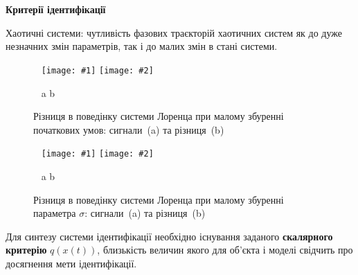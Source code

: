 \documentclass[14pt,handout,utf8]{beamer}
\newcommand{\Xhead}[1]{
 \begin{center}%
      \textbf{#1}%
 \end{center}%
}
\newcommand{\ABlbl}{%
  \vspace{-2.9ex}
  \begin{center}
    ~ \hfill a \hfill\hfill b \hfill ~
  \end{center}
  \vspace{-2.0ex}
}
\newcommand{\PicDouble}[2]{%
 \begin{center}
    ~ \hfill
    \texttt{[image: \#1]}
    \hfill
    \texttt{[image: \#2]}
    \hfill ~
  \end{center}
  \ABlbl
}
\begin{document}



\begin{frame}
  \frametitle{~}

  \Xhead{Критерії ідентифікації}

  Хаотичні системи: чутливість фазових траєкторій
  хаотичних систем як до дуже незначних змін параметрів,
  так і до малих змін в стані системи.

  \begin{figure}
    \PicDouble{../p3/p/lor_diff-p_xx_x0.png}{../p3/p/lor_diff-p_dx_x0.png}
    \caption{Різниця в поведінку системи Лоренца при малому збуренні початкових умов: сигнали~(a) та різниця~(b)}
    \label{atu:f:lor_diff_x0}
  \end{figure}

  \vspace{-5ex}

  \begin{figure}
    \PicDouble{../p3/p/lor_diff-p_xx_sigma.png}{../p3/p/lor_diff-p_dx_sigma.png}
    \caption{Різниця в поведінку системи Лоренца при малому збуренні параметра $\sigma$: сигнали~(a) та різниця~(b)}
    \label{atu:f:lor_diff_sigma}
  \end{figure}

  \vspace{-3ex}

  Для синтезу системи ідентифікації необхідно існування заданого
  \textbf{скалярного критерію} $q(x(t))$, близькість величин якого для об'єкта і моделі
  свідчить про досягнення мети ідентифікації.

\end{frame}

\end{document}

